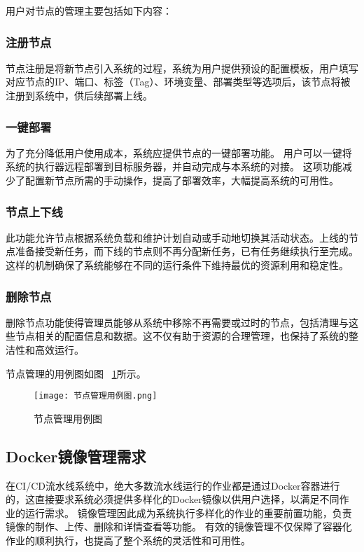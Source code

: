 用户对节点的管理主要包括如下内容：
\subsubsection{注册节点}
节点注册是将新节点引入系统的过程，系统为用户提供预设的配置模板，用户填写对应节点的IP、端口、标签（Tag）、环境变量、部署类型等选项后，该节点将被注册到系统中，供后续部署上线。

\subsubsection{一键部署}
为了充分降低用户使用成本，系统应提供节点的一键部署功能。
用户可以一键将系统的执行器远程部署到目标服务器，并自动完成与本系统的对接。
这项功能减少了配置新节点所需的手动操作，提高了部署效率，大幅提高系统的可用性。

\subsubsection{节点上下线}
此功能允许节点根据系统负载和维护计划自动或手动地切换其活动状态。上线的节点准备接受新任务，而下线的节点则不再分配新任务，已有任务继续执行至完成。
这样的机制确保了系统能够在不同的运行条件下维持最优的资源利用和稳定性。

\subsubsection{删除节点}
删除节点功能使得管理员能够从系统中移除不再需要或过时的节点，包括清理与这些节点相关的配置信息和数据。这不仅有助于资源的合理管理，也保持了系统的整洁性和高效运行。

节点管理的用例图如图~ \ref{fig:节点管理用例图}所示。
\begin{figure}[h]
  \centering
  \texttt{[image: 节点管理用例图.png]}
  \caption{节点管理用例图}
  \label{fig:节点管理用例图}
\end{figure}

\subsection{Docker镜像管理需求}
在CI/CD流水线系统中，绝大多数流水线运行的作业都是通过Docker容器进行的，这直接要求系统必须提供多样化的Docker镜像以供用户选择，以满足不同作业的运行需求。
镜像管理因此成为系统执行多样化的作业的重要前置功能，负责镜像的制作、上传、删除和详情查看等功能。
有效的镜像管理不仅保障了容器化作业的顺利执行，也提高了整个系统的灵活性和可用性。

